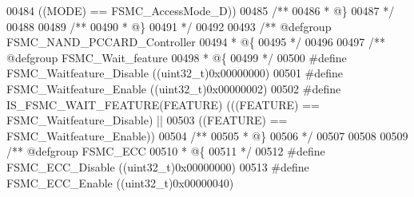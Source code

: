 \begin{DoxyCode}
00484                                    \textcolor{preprocessor}{(}\textcolor{preprocessor}{(}\textcolor{preprocessor}{MODE}\textcolor{preprocessor}{)} \textcolor{preprocessor}{==} FSMC_AccessMode_D\textcolor{preprocessor}{)}\textcolor{preprocessor}{)}
00485 \textcolor{comment}{/**}
00486 \textcolor{comment}{  * @\}}
00487 \textcolor{comment}{  */}
00488 
00489 \textcolor{comment}{/**}
00490 \textcolor{comment}{  * @\}}
00491 \textcolor{comment}{  */}
00492 
00493 \textcolor{comment}{/** @defgroup FSMC\_NAND\_PCCARD\_Controller }
00494 \textcolor{comment}{  * @\{}
00495 \textcolor{comment}{  */}
00496 
00497 \textcolor{comment}{/** @defgroup FSMC\_Wait\_feature }
00498 \textcolor{comment}{  * @\{}
00499 \textcolor{comment}{  */}
00500 \textcolor{preprocessor}{#}\textcolor{preprocessor}{define} \textcolor{preprocessor}{FSMC\_Waitfeature\_Disable}                 \textcolor{preprocessor}{(}\textcolor{preprocessor}{(}\textcolor{preprocessor}{uint32\_t}\textcolor{preprocessor}{)}0x00000000\textcolor{preprocessor}{)}
00501 \textcolor{preprocessor}{#}\textcolor{preprocessor}{define} \textcolor{preprocessor}{FSMC\_Waitfeature\_Enable}                  \textcolor{preprocessor}{(}\textcolor{preprocessor}{(}\textcolor{preprocessor}{uint32\_t}\textcolor{preprocessor}{)}0x00000002\textcolor{preprocessor}{)}
00502 \textcolor{preprocessor}{#}\textcolor{preprocessor}{define} \textcolor{preprocessor}{IS\_FSMC\_WAIT\_FEATURE}\textcolor{preprocessor}{(}\textcolor{preprocessor}{FEATURE}\textcolor{preprocessor}{)} \textcolor{preprocessor}{(}\textcolor{preprocessor}{(}\textcolor{preprocessor}{(}\textcolor{preprocessor}{FEATURE}\textcolor{preprocessor}{)} \textcolor{preprocessor}{==} 
      FSMC_Waitfeature_Disable\textcolor{preprocessor}{)} \textcolor{preprocessor}{||}
00503                                        \textcolor{preprocessor}{(}\textcolor{preprocessor}{(}\textcolor{preprocessor}{FEATURE}\textcolor{preprocessor}{)} \textcolor{preprocessor}{==} 
      FSMC_Waitfeature_Enable\textcolor{preprocessor}{)}\textcolor{preprocessor}{)}
00504 \textcolor{comment}{/**}
00505 \textcolor{comment}{  * @\}}
00506 \textcolor{comment}{  */}
00507 
00508 
00509 \textcolor{comment}{/** @defgroup FSMC\_ECC }
00510 \textcolor{comment}{  * @\{}
00511 \textcolor{comment}{  */}
00512 \textcolor{preprocessor}{#}\textcolor{preprocessor}{define} \textcolor{preprocessor}{FSMC\_ECC\_Disable}                         \textcolor{preprocessor}{(}\textcolor{preprocessor}{(}\textcolor{preprocessor}{uint32\_t}\textcolor{preprocessor}{)}0x00000000\textcolor{preprocessor}{)}
00513 \textcolor{preprocessor}{#}\textcolor{preprocessor}{define} \textcolor{preprocessor}{FSMC\_ECC\_Enable}                          \textcolor{preprocessor}{(}\textcolor{preprocessor}{(}\textcolor{preprocessor}{uint32\_t}\textcolor{preprocessor}{)}0x00000040\textcolor{preprocessor}{)}

\end{DoxyCode}
